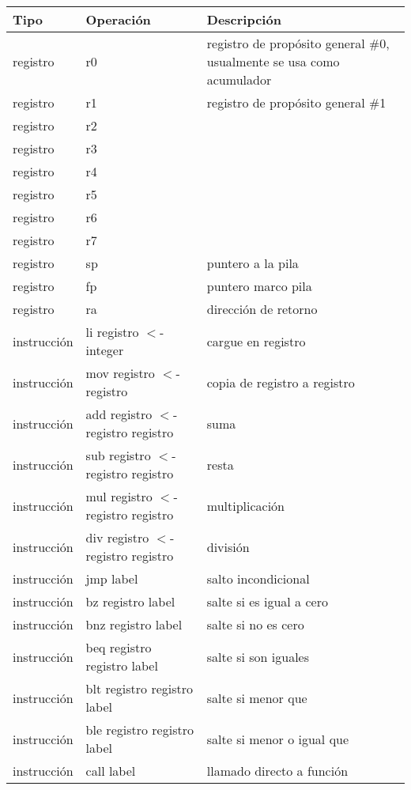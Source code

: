 \documentclass[10pt,a4paper]{article}
\begin{document}
\begin{center}
\begin{table}
\begin{tabular}{| l | l | p{5cm} |}
\hline
Tipo & Operación & Descripción \\ \hline
registro & r0 & registro de propósito general \#0, usualmente se usa como acumulador \\ \hline
registro & r1 & registro de propósito general \#1 \\ \hline
registro & r2 & \\ \hline
registro & r3 &  \\ \hline
registro & r4 &  \\ \hline
registro & r5 &  \\ \hline
registro & r6 &  \\ \hline
registro & r7 &  \\ \hline
registro & sp & puntero a la pila \\ \hline
registro & fp & puntero marco pila \\ \hline
registro & ra & dirección de retorno \\ \hline
instrucción & li registro $<$- integer & cargue en registro  \\ \hline 
instrucción & mov registro $<$- registro & copia de registro a registro  \\ \hline
instrucción & add registro $<$- registro registro & suma\\ \hline
instrucción & sub registro $<$- registro registro & resta\\ \hline
instrucción & mul registro $<$- registro registro & multiplicación\\ \hline
instrucción & div registro $<$- registro registro & división \\ \hline
instrucción & jmp label & salto incondicional \\ \hline
instrucción & bz registro label & salte si es igual a cero\\ \hline 
instrucción & bnz registro label & salte si no es cero  \\ \hline
instrucción & beq registro registro label & salte si son iguales  \\ \hline
instrucción & blt registro registro label & salte si menor que  \\ \hline
instrucción & ble registro registro label & salte si menor o igual que \\ \hline
instrucción & call label & llamado directo a función \\ \hline

\end{tabular}
\end{table}
\end{center}
\end{document}
